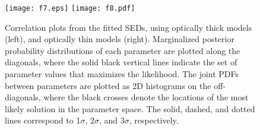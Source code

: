 \documentclass[iop, revtex4]{emulateapj}
\begin{document}
\begin{figure}[!tbph]
\centering
\hspace{-1.1cm}
\texttt{[image: f7.eps]}
\hspace{-1cm}
\texttt{[image: f8.pdf]}
\hspace{-1.1cm}
\caption{Correlation plots from the fitted SEDs, using optically thick
models (left), and optically thin models (right). Marginalized posterior probability
distributions of each
parameter are plotted along the diagonals, where the solid black vertical lines indicate the set of parameter values that maximizes the likelihood. The joint PDFs between parameters are plotted as 2D histograms on the off-diagonals, where the black crosses denote the
locations of the most likely solution in the parameter space. The solid, dashed, and dotted lines correspond to 1$\sigma$, 2$\sigma$, and $3\sigma$, respectively.
\label{fig:sedlikelihood}}
\end{figure}
\end{document}
